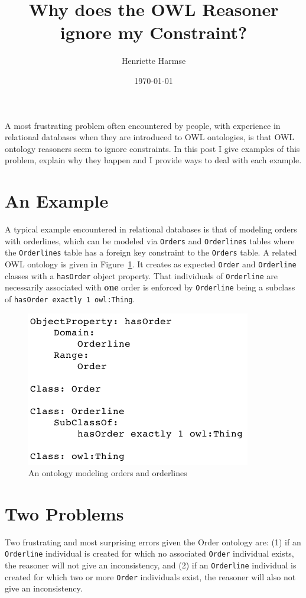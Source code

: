 \documentclass{amsart}
\title{Why does the OWL Reasoner ignore my Constraint?}
\author{Henriette Harmse}
\date{\today}
\begin{document}
  \maketitle
  
  
  A most frustrating problem often encountered by people, with experience in relational databases when they are introduced to OWL ontologies, is that OWL ontology reasoners seem to ignore constraints. In this post I give examples of this problem, explain why they happen and I provide ways to deal with each example. 
  
  \section{An Example}
  A typical example encountered in relational databases is that of modeling orders with orderlines, which can be modeled via \texttt{Orders} and \texttt{Orderlines} tables where the \texttt{Orderlines} table has a foreign key constraint to the \texttt{Orders} table. A related OWL ontology is given in Figure~\ref{f_Order}. It creates as expected \texttt{Order} and \texttt{Orderline} classes with a \texttt{hasOrder} object property. That individuals of \texttt{Orderline} are necessarily associated with \textbf{one} order is enforced by \texttt{Orderline} being a subclass of \texttt{hasOrder exactly 1 owl:Thing}. 
  
    \begin{figure}
      \centering \includegraphics[trim = 0mm 0mm 0mm 0mm, clip, scale=0.5]{./Order.png}
      \vspace{-3mm}
      \caption{An ontology modeling orders and orderlines}\label{f_Order}
    \end{figure}
    
  \section{Two Problems}
  Two frustrating and most surprising errors given the Order ontology are: (1) if an \texttt{Orderline} individual is created for which no associated \texttt{Order} individual exists, the reasoner will not give an inconsistency, and (2) if an \texttt{Orderline} individual is created for which two or more \texttt{Order} individuals exist, the reasoner will also not give an inconsistency.
  
\end{document}
